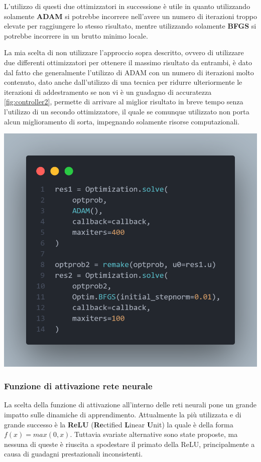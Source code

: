 L'utilizzo di questi due ottimizzatori in successione è utile in quanto utilizzando solamente \textbf{ADAM} si potrebbe 
incorrere nell'avere un numero di iterazioni troppo elevate per raggiungere lo stesso risultato, mentre utilizzando solamente \textbf{BFGS} si 
potrebbe incorrere in un brutto minimo locale.

La mia scelta di non utilizzare l'approccio sopra descritto, ovvero di utilizzare due differenti ottimizzatori per 
ottenere il massimo risultato da entrambi, è dato dal fatto che generalmente l'utilizzo di ADAM 
con un numero di iterazioni molto contenuto, dato anche dall'utilizzo di una tecnica per ridurre ulteriormente
le iterazioni di addestramento se non vi è un guadagno di accuratezza \ref{fig:controller2}, 
permette di arrivare al miglior risultato in breve tempo senza l'utilizzo di un 
secondo ottimizzatore, il quale se comunque utilizzato non porta alcun 
miglioramento di sorta, impegnando solamente risorse computazionali.

\begin{minipage}{\linewidth}
	\centering
	\includegraphics[width=\textwidth]{img/optimizers_example.png}
	\label{fig:two_otpimizers}
\end{minipage}

\subsubsection*{Funzione di attivazione rete neurale}
La scelta della funzione di attivazione all'interno delle reti neurali pone un grande impatto sulle 
dinamiche di apprendimento. Attualmente la più utilizzata e di grande successo è la \textbf{ReLU}
(\textbf{Re}ctified \textbf{L}inear \textbf{U}nit) la quale è della forma $f(x) = max(0,x)$. 
Tuttavia svariate alternative sono state proposte, ma nessuna di queste è riuscita a 
spodestare il primato della ReLU, principalmente a causa di guadagni prestazionali inconsistenti. 

